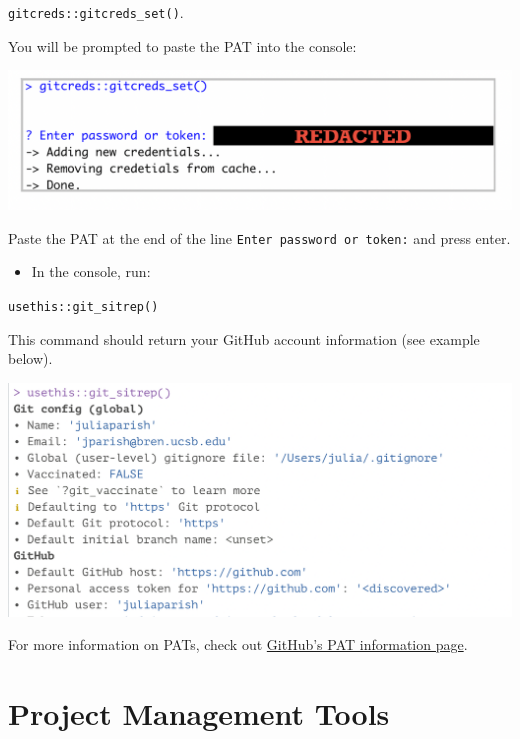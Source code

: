 \documentclass[
]{book}
\providecommand{\tightlist}{%
  \setlength{\itemsep}{0pt}\setlength{\parskip}{0pt}}
\begin{document}
\texttt{gitcreds::gitcreds\_set()}.

You will be prompted to paste the PAT into the console:

\begin{center}\includegraphics{images/paste_pat} \end{center}

Paste the PAT at the end of the line \texttt{Enter\ password\ or\ token:} and press enter.

\begin{itemize}
\tightlist
\item
  In the console, run:
\end{itemize}

\texttt{usethis::git\_sitrep()}

This command should return your GitHub account information (see example below).

\begin{center}\includegraphics{images/gitsitrep} \end{center}

For more information on PATs, check out \href{https://docs.github.com/en/authentication/keeping-your-account-and-data-secure/creating-a-personal-access-token}{GitHub's PAT information page}.

\hypertarget{projmgmt}{%
\chapter{Project Management Tools}\label{projmgmt}}
\end{document}
